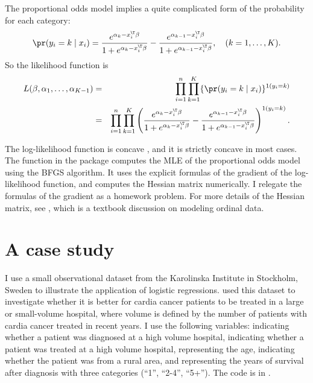 The proportional odds model implies a quite complicated form
of the probability for each category:
$$
\pr(y_{i}=k\mid x_{i})=\frac{e^{\alpha_{k}-x_{i}^{\T}\beta}}{1+e^{\alpha_{k}-x_{i}^{\T}\beta}}-\frac{e^{\alpha_{k-1}-x_{i}^{\T}\beta}}{1+e^{\alpha_{k-1}-x_{i}^{\T}\beta}}, \quad  (k=1,\ldots,K).
$$
So the likelihood function is
\begin{eqnarray*}
L(\beta,\alpha_{1},\ldots,\alpha_{K-1}) 
&=& \prod_{i=1}^n \prod_{k=1}^K \{ \pr(y_{i}=k\mid x_{i})\}^{1(y_i = k)} \\
&=&  \prod_{i=1}^n \prod_{k=1}^K  \left( \frac{e^{\alpha_{k}-x_{i}^{\T}\beta}}{1+e^{\alpha_{k}-x_{i}^{\T}\beta}}-\frac{e^{\alpha_{k-1}-x_{i}^{\T}\beta}}{1+e^{\alpha_{k-1}-x_{i}^{\T}\beta}}\right)^{1(y_i = k)} .
\end{eqnarray*} 

The log-likelihood function is concave \citep{pratt1981concavity, burridge1981note}, and it is strictly concave in most cases. The function  in the  package  computes the MLE of the proportional odds model using the BFGS algorithm. It uses the explicit formulas of the gradient of the log-likelihood function, and computes the Hessian matrix numerically. I relegate the formulas of the gradient as a homework problem. For more details of the Hessian matrix, see \citet{agresti2010analysis}, which is a textbook discussion on modeling ordinal data. 
 
 


\section{A case study}\label{sec::multinomial-case-study}


I use a small observational dataset from the Karolinska Institute in Stockholm, Sweden to illustrate the application of logistic regressions. \citet{rubin2008objective} used this dataset to investigate whether it is better for cardia cancer patients to be treated in a large or small-volume hospital, where volume is defined by the number of patients with cardia cancer treated in recent years. I use the following variables:  indicating whether a patient was diagnosed at a high volume hospital,  indicating whether a patient was treated at a high volume hospital,  representing the age,  indicating whether the patient was from a rural area, and  representing the years of survival after diagnosis with three categories (``1'', ``2-4'', ``5+''). The  code is in .

